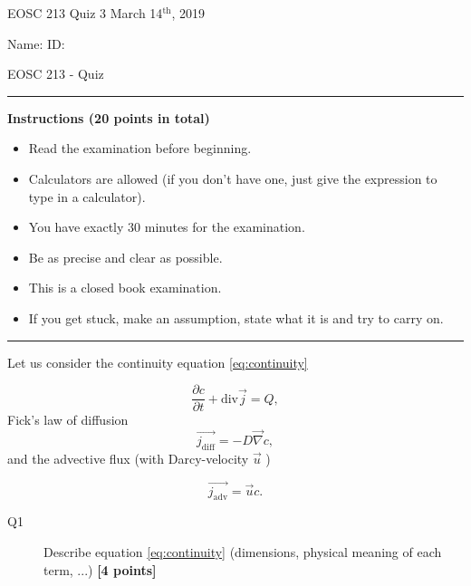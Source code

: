 \documentclass{article}
\begin{document}
\pagestyle{empty}

\large{EOSC 213 Quiz 3} \hspace{10cm} \large{March 14$^{\textrm{th}}$, 2019}

\large{Name:} \hspace{12cm} \large{ID: }
\begin{center}
\Huge{EOSC 213 - Quiz}
\end{center}

\rule{\textwidth}{1pt}

\large{\textbf{Instructions (20 points in total)}}
\begin{multicols}{2}
\begin{itemize}
\item Read the examination before beginning.
\item Calculators are allowed (if you don't have one, just give the expression to type in a calculator).
\item You have exactly 30 minutes for the examination.
\item Be as precise and clear as possible.
\item This is a closed book examination.
\item If you get stuck, make an assumption, state what it is and try to carry on.
\end{itemize} 
\end{multicols}


\rule{\textwidth}{1pt}


Let us consider the continuity equation \ref{eq:continuity}

\begin{equation}
\frac{\partial c}{\partial t} + \mathrm{div} \overrightarrow{j} = Q, \label{eq:continuity}
\end{equation} Fick's law of diffusion
\begin{equation}
\overrightarrow{j_{\mathrm{diff}}} = - D \overrightarrow{\nabla} c, \label{eq:fick}
\end{equation} and the advective flux (with Darcy-velocity $ \overrightarrow{u} $ )

\begin{equation}
\overrightarrow{j_{\mathrm{adv}}} = \overrightarrow{u} c. \label{eq:adv}
\end{equation}
\begin{description}
\item [Q1] Describe equation \ref{eq:continuity} (dimensions, physical meaning of each term, ...) \textbf{[4 points]}
\vspace{4cm}
\end{description}
\end{document}
